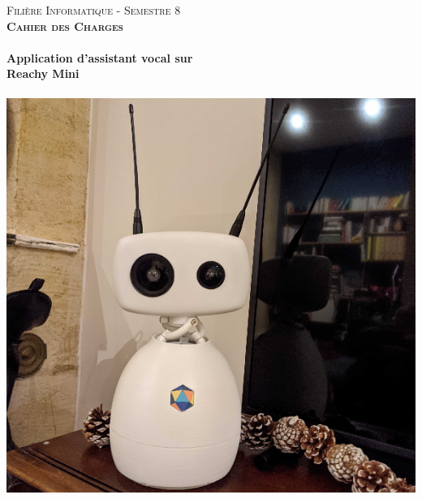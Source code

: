 \begin{titlepage}
\centering
\vspace*{1\baselineskip}
\LARGE{\textsc{Filière Informatique - Semestre 8}} \\
\vspace*{\baselineskip}
\LARGE{\textsc{\bfseries{Cahier des Charges}}} \\

\vspace*{2\baselineskip}
\hrulefill \\[0.4cm]
{ \Huge \bfseries Application d'assistant vocal sur \\[0.4cm] }
{ \Huge \bfseries Reachy Mini \\[0.4cm] }
\hrulefill \\[1.5cm]
\vspace*{\baselineskip}
\centering
\includegraphics[scale=0.5]{Reachy-mini.png}
\\
\vspace*{2\baselineskip}


\end{titlepage}
